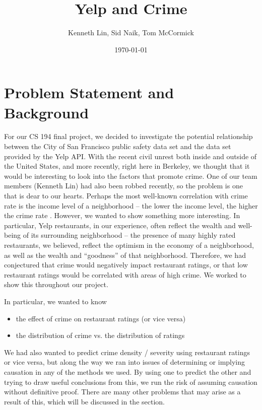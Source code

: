 \documentclass{article}
\title{Yelp and Crime}  %
\author{Kenneth Lin, Sid Naik, Tom McCormick}
\date{\today}
\begin{document}
\maketitle

\section{Problem Statement and Background}

For our CS 194 final project, we decided to investigate the potential
relationship between the City of San Francisco public safety data set and
the data set provided by the Yelp API. With the recent civil unrest both
inside and outside of the United States, and more recently, right here in
Berkeley, we thought that it would be interesting to look into the factors
that promote crime. One of our team members (Kenneth Lin) had also been
robbed recently, so the problem is one that is dear to our hearts. Perhaps
the most well-known correlation with crime rate is the income level of a
neighborhood -- the lower the income level, the higher the crime rate
\cite[p.93-94]{levitt-the-changing-relationship}. However, we wanted to
show something more interesting. In particular, Yelp restaurants, in our
experience, often reflect the wealth and well-being of its surrounding
neighborhood -- the presence of many highly rated restaurants, we believed,
reflect the optimism in the economy of a neighborhood, as well as the
wealth and ``goodness'' of that neighborhood. Therefore, we had conjectured
that crime would negatively impact restaurant ratings, or that low
restaurant ratings would be correlated with areas of high crime. We worked
to show this throughout our project.


In particular, we wanted to know

\begin{itemize}
\item the effect of crime on restaurant ratings (or vice versa)
\item the distribution of crime vs. the distribution of ratings
\end{itemize}

We had also wanted to predict crime density / severity using restaurant
ratings or vice versa, but along the way we ran into issues of determining
or implying causation in any of the methods we used. By using one to
predict the other and trying to draw useful conclusions from this, we run
the risk of assuming causation without definitive proof. There are many
other problems that may arise as a result of this, which will be discussed
in the \textbf{} section.
\end{document}
